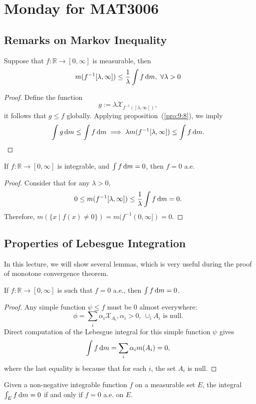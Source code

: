 
\section{Monday for MAT3006}
\subsection{Remarks on Markov Inequality}
\begin{proposition}
Suppose that $f:\mathbb{R}\to[0,\infty]$ is measurable, then
\[
m(f^{-1}[\lambda,\infty])\le\frac{1}{\lambda}\int f\,\mathrm{d} m,\ \forall\lambda>0
\]
\end{proposition}
\begin{proof}
Define the function
\[
g:=\lambda\mathcal{X}_{f^{-1}([\lambda,\infty])},
\]
it follows that $g\le f$ globally. Applying proposition~(\ref{pro:9:8}), we imply
\[
\int g\,\mathrm{d} m\le\int f\,\mathrm{d} m\implies
\lambda m(f^{-1}[\lambda,\infty])\le \int f\,\mathrm{d} m.
\]
\end{proof}
\begin{corollary}
If $f:\mathbb{R}\to[0,\infty]$ is integrable, and $\int f\,\mathrm{d} m=0$, then $f=0$ a.e.
\end{corollary}
\begin{proof}
Consider that for any $\lambda>0$,
\[
0\le m(f^{-1}[\lambda,\infty])\le\frac{1}{\lambda}\int f\,\mathrm{d} m=0.
\]
Therefore, $m(\{x\mid f(x)\ne0\})=m(f^{-1}(0,\infty])=0$.
\end{proof}

\subsection{Properties of Lebesgue Integration}
In this lecture, we will show several lemmas, which is very useful during the proof of monotone convergence theorem.
\begin{proposition}
If $f:\mathbb{R}\to[0,\infty]$ is such that $f=0$ a.e., then $\int f\,\mathrm{d} m=0$.
\end{proposition}
\begin{proof}
Any simple function $\psi\le f$ must be 0 almost everywhere:
\[
\phi=\sum_i\alpha_i\mathcal{X}_{A_i},\alpha_i>0,\ \cup_{i}A_i\text{ is null}.
\]
Direct computation of the Lebesgue integral for this simple function $\psi$ gives
\[
\int f\,\mathrm{d} m = \sum_i\alpha_im(A_i)=0,
\]
where the last equality is because that for each $i$, the set $A_i$ is null.
\end{proof}
\begin{remark}
Given a non-negative integrable function $f$ on a measurable set $E$, the integral $\int_Ef\,\mathrm{d} m=0$ if and only if $f=0$ a.e. on $E$.
\end{remark}

